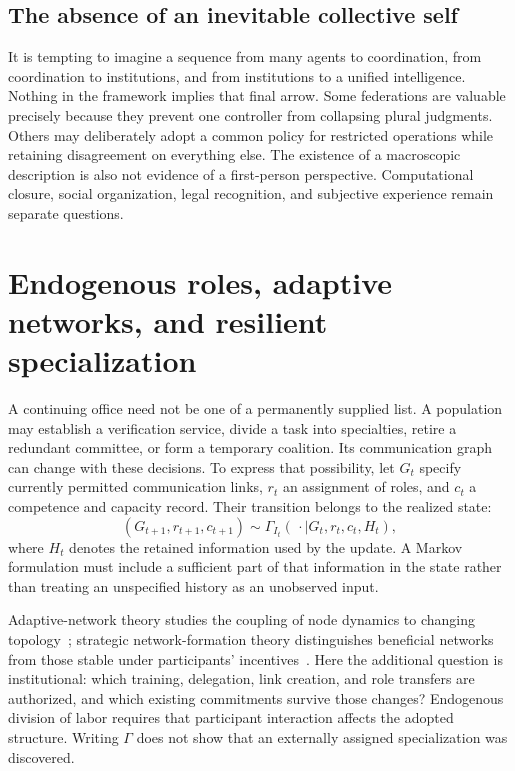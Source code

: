 \documentclass[11pt,letterpaper]{article}
\theoremstyle{plain}
\theoremstyle{definition}
\theoremstyle{remark}
\begin{document}
\subsection{The absence of an inevitable collective self}

It is tempting to imagine a sequence from many agents to coordination, from coordination to institutions, and from institutions to a unified intelligence. Nothing in the framework implies that final arrow. Some federations are valuable precisely because they prevent one controller from collapsing plural judgments. Others may deliberately adopt a common policy for restricted operations while retaining disagreement on everything else. The existence of a macroscopic description is also not evidence of a first-person perspective. Computational closure, social organization, legal recognition, and subjective experience remain separate questions.

\section{Endogenous roles, adaptive networks, and resilient specialization}\label{sec:specialization}

A continuing office need not be one of a permanently supplied list. A population may establish a verification service, divide a task into specialties, retire a redundant committee, or form a temporary coalition. Its communication graph can change with these decisions. To express that possibility, let $G_t$ specify currently permitted communication links, $r_t$ an assignment of roles, and $c_t$ a competence and capacity record. Their transition belongs to the realized state:
\[
(G_{t+1},r_{t+1},c_{t+1})\sim
\Gamma_{I_t}(\,\cdot\mid G_t,r_t,c_t,H_t),
\]
where $H_t$ denotes the retained information used by the update. A Markov formulation must include a sufficient part of that information in the state rather than treating an unspecified history as an unobserved input.

Adaptive-network theory studies the coupling of node dynamics to changing topology~\cite{grossblasius}; strategic network-formation theory distinguishes beneficial networks from those stable under participants' incentives~\cite{jacksonwolinsky}. Here the additional question is institutional: which training, delegation, link creation, and role transfers are authorized, and which existing commitments survive those changes? Endogenous division of labor requires that participant interaction affects the adopted structure. Writing $\Gamma$ does not show that an externally assigned specialization was discovered.
\end{document}
